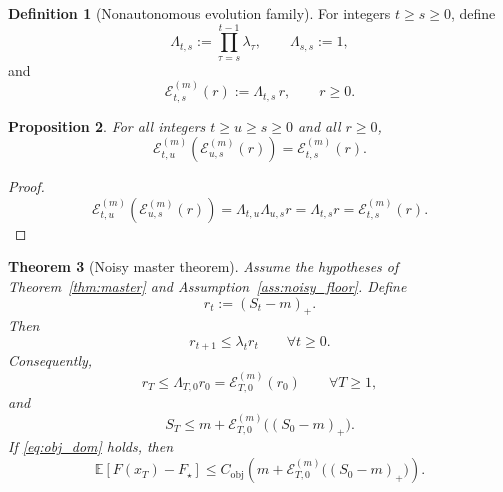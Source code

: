 \documentclass{article}
\newtheorem{theorem}{Theorem}[section]
\newtheorem{proposition}[theorem]{Proposition}
\theoremstyle{definition}
\newtheorem{definition}[theorem]{Definition}
\begin{document}
\begin{definition}[Nonautonomous evolution family]
\label{def:evolution}
For integers $t\ge s\ge 0$, define
\begin{equation}
\Lambda_{t,s}:=\prod_{\tau=s}^{t-1}\lambda_\tau,
\qquad
\Lambda_{s,s}:=1,
\label{eq:Lambda}
\end{equation}
and
\begin{equation*}
\mathcal E_{t,s}^{(m)}(r):=\Lambda_{t,s}\,r,
\qquad
r\ge 0.
\end{equation*}
\end{definition}

\begin{proposition}
\label{prop:evolution}
For all integers $t\ge u\ge s\ge 0$ and all $r\ge 0$,
\begin{equation*}
\mathcal E_{t,u}^{(m)}(\mathcal E_{u,s}^{(m)}(r))
=
\mathcal E_{t,s}^{(m)}(r).
\end{equation*}
\end{proposition}

\begin{proof}
\[
\mathcal E_{t,u}^{(m)}(\mathcal E_{u,s}^{(m)}(r))
=
\Lambda_{t,u}\Lambda_{u,s}r
=
\Lambda_{t,s}r
=
\mathcal E_{t,s}^{(m)}(r).
\]
\end{proof}

\begin{theorem}[Noisy master theorem]
\label{thm:noisy}
Assume the hypotheses of Theorem~\ref{thm:master} and Assumption~\ref{ass:noisy_floor}.
Define
\begin{equation*}
r_t:=(S_t-m)_+.
\end{equation*}
Then
\begin{equation}
r_{t+1}\le \lambda_t r_t
\qquad
\forall t\ge 0.
\label{eq:noisy_onestep}
\end{equation}
Consequently,
\begin{equation}
r_T
\le
\Lambda_{T,0}r_0
=
\mathcal E_{T,0}^{(m)}(r_0)
\qquad
\forall T\ge 1,
\label{eq:noisy_evolution}
\end{equation}
and
\begin{equation}
S_T
\le
m+\mathcal E_{T,0}^{(m)}\bigl((S_0-m)_+\bigr).
\label{eq:noisy_bound}
\end{equation}
If \eqref{eq:obj_dom} holds, then
\begin{equation}
\mathbb E[F(x_T)-F_\star]
\le
C_{\mathrm{obj}}
\left(
m+\mathcal E_{T,0}^{(m)}\bigl((S_0-m)_+\bigr)
\right).
\label{eq:noisy_obj}
\end{equation}
\end{theorem}
\end{document}
